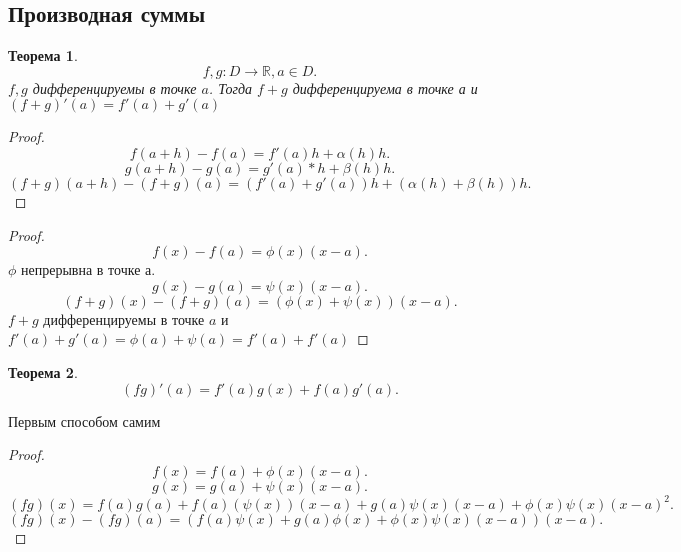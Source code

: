 \documentclass[a4paper]{article}
\newtheorem{theorem}{Теорема}
\begin{document}
\subsection{Производная суммы}
\begin{theorem}
    \[
    f,g: D \to \mathbb{R}, a \in D
    .\] 
    $f,g$ дифференцируемы в точке  $a$. Тогда  $f + g$ дифференцируема в точке а и  $(f + g)'(a) =
    f'(a) + g'(a)$
\end{theorem}
\begin{proof}
    \[
    f(a +  h) - f(a) = f'(a)h + \alpha(h)h
    .\] 
    \[
    g(a + h) - g(a) = g'(a)*h + \beta(h)h
    .\] 
    \[
        (f + g)(a + h) - (f + g)(a) = (f'(a)  + g'(a))h + (\alpha(h) + \beta(h))h
    .\] 
\end{proof}
\begin{proof}
    \[
    f(x) - f(a) = \phi(x)(x - a)
    .\] 
    $\phi$ непрерывна в точке а.
     \[
    g(x) - g(a) = \psi(x)(x - a)
    .\] 
    \[
        (f + g)(x) - (f + g)(a) = (\phi(x) + \psi(x))(x - a)
    .\] 
    $f + g$ дифференцируемы в точке  $a$ и  $f'(a) + g'(a) =\phi(a)  + \psi(a) = f'(a) + f'(a)$
\end{proof}
\begin{theorem}
    \[
        (fg)'(a) = f'(a)g(x) +f(a)g'(a)
    .\] 
\end{theorem}
Первым способом самим
\begin{proof}
    \[
        f(x) = f(a) + \phi(x)(x - a)
    .\] 
    \[
    g(x) = g(a)  + \psi(x)(x - a)
    .\] 
    \[
        (fg)(x) = f(a)g(a) + f(a)(\psi(x))(x - a) + g(a)\psi(x)(x-a) + \phi(x)\psi(x)(x - a)^2
    .\] 
    \[
        (fg)(x)  - (fg)(a) = (f(a)\psi(x) + g(a)\phi(x) + \phi(x)\psi(x)(x-a))(x - a)
    .\] 
\end{proof}
\end{document}
